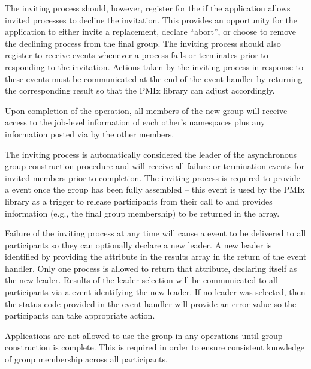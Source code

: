 The inviting process should, however, register for the  if the application allows invited processes to decline the invitation. This provides an opportunity for the application to either invite a replacement, declare ``abort'', or choose to remove the declining process from the final group. The inviting process should also register to receive  events whenever a process fails or terminates prior to responding to the invitation. Actions taken by the inviting process in response to these events must be communicated at the end of the event handler by returning the corresponding result so that the \ac{PMIx} library can adjust accordingly.

Upon completion of the operation, all members of the new group will receive access to the job-level information of each other’s namespaces plus any information posted via  by the other members.

The inviting process is automatically considered the leader of the asynchronous group construction procedure and will receive all failure or termination events for invited members prior to completion. The inviting process is required to provide a  event once the group has been fully assembled – this event is used by the \ac{PMIx} library as a trigger to release participants from their call to  and provides information (e.g., the final group membership) to be returned in the  array.

Failure of the inviting process at any time will cause a  event to be delivered to all participants so they can optionally declare a new leader. A new leader is identified by providing the  attribute in the results array in the return of the event handler. Only one process is allowed to return that attribute, declaring itself as the new leader. Results of the leader selection will be communicated to all participants via a  event identifying the new leader. If no leader was selected, then the status code provided in the event handler will provide an error value so the participants can take appropriate action.

\adviceuserstart
Applications are not allowed to use the group in any operations until group construction is complete. This is required in order to ensure consistent knowledge of group membership across all participants.
\adviceuserend


